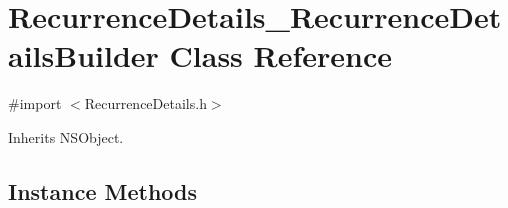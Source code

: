 \hypertarget{interface_recurrence_details___recurrence_details_builder}{}\section{Recurrence\+Details\+\_\+\+Recurrence\+Details\+Builder Class Reference}
\label{interface_recurrence_details___recurrence_details_builder}


{\ttfamily \#import $<$Recurrence\+Details.\+h$>$}



Inherits N\+S\+Object.

\subsection*{Instance Methods}
